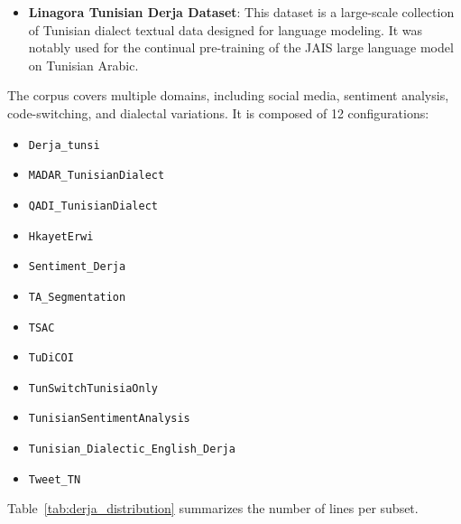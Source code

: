 \documentclass[12pt,a4paper]{report}
\begin{document}
\begin{itemize}
\item \textbf{Linagora Tunisian Derja Dataset}:
This dataset is a large-scale collection of Tunisian dialect textual data
designed for language modeling. It was notably used for the continual
pre-training of the JAIS large language model on Tunisian Arabic.
\end{itemize}
The corpus covers multiple domains, including social media, sentiment analysis,
code-switching, and dialectal variations. It is composed of 12 configurations:


\begin{itemize}
    \item \texttt{Derja\_tunsi}
    \item \texttt{MADAR\_TunisianDialect}
    \item \texttt{QADI\_TunisianDialect}
    \item \texttt{HkayetErwi}
    \item \texttt{Sentiment\_Derja}
    \item \texttt{TA\_Segmentation}
    \item \texttt{TSAC}
    \item \texttt{TuDiCOI}
    \item \texttt{TunSwitchTunisiaOnly}
    \item \texttt{TunisianSentimentAnalysis}
    \item \texttt{Tunisian\_Dialectic\_English\_Derja}
    \item \texttt{Tweet\_TN}
\end{itemize}

Table~\ref{tab:derja_distribution} summarizes the number of lines per subset.
\end{document}

